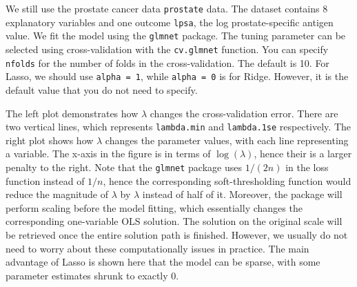 \documentclass[
]{book}
\newenvironment{Shaded}{\begin{snugshade}}{\end{snugshade}}
\newcommand{\AttributeTok}[1]{\textcolor[rgb]{0.13,0.29,0.53}{#1}}
\newcommand{\DecValTok}[1]{\textcolor[rgb]{0.00,0.00,0.81}{#1}}
\newcommand{\FunctionTok}[1]{\textcolor[rgb]{0.13,0.29,0.53}{\textbf{#1}}}
\newcommand{\NormalTok}[1]{#1}
\newcommand{\OtherTok}[1]{\textcolor[rgb]{0.56,0.35,0.01}{#1}}
\newcommand{\SpecialCharTok}[1]{\textcolor[rgb]{0.81,0.36,0.00}{\textbf{#1}}}
\newcommand{\StringTok}[1]{\textcolor[rgb]{0.31,0.60,0.02}{#1}}
\theoremstyle{definition}
\theoremstyle{definition}
\theoremstyle{definition}
\theoremstyle{definition}
\theoremstyle{remark}
\begin{document}
We still use the prostate cancer data \texttt{prostate} data. The dataset contains 8 explanatory variables and one outcome \texttt{lpsa}, the log prostate-specific antigen value. We fit the model using the \texttt{glmnet} package. The tuning parameter can be selected using cross-validation with the \texttt{cv.glmnet} function. You can specify \texttt{nfolds} for the number of folds in the cross-validation. The default is 10. For Lasso, we should use \texttt{alpha\ =\ 1}, while \texttt{alpha\ =\ 0} is for Ridge. However, it is the default value that you do not need to specify.

\begin{Shaded}
\end{Shaded}

The left plot demonstrates how \(\lambda\) changes the cross-validation error. There are two vertical lines, which represents \texttt{lambda.min} and \texttt{lambda.1se} respectively. The right plot shows how \(\lambda\) changes the parameter values, with each line representing a variable. The x-axis in the figure is in terms of \(\log(\lambda)\), hence their is a larger penalty to the right. Note that the \texttt{glmnet} package uses \(1/(2n)\) in the loss function instead of \(1/n\), hence the corresponding soft-thresholding function would reduce the magnitude of \(\lambda\) by \(\lambda\) instead of half of it. Moreover, the package will perform scaling before the model fitting, which essentially changes the corresponding one-variable OLS solution. The solution on the original scale will be retrieved once the entire solution path is finished. However, we usually do not need to worry about these computationally issues in practice. The main advantage of Lasso is shown here that the model can be sparse, with some parameter estimates shrunk to exactly 0.

\begin{Shaded}
\end{Shaded}
\end{document}
